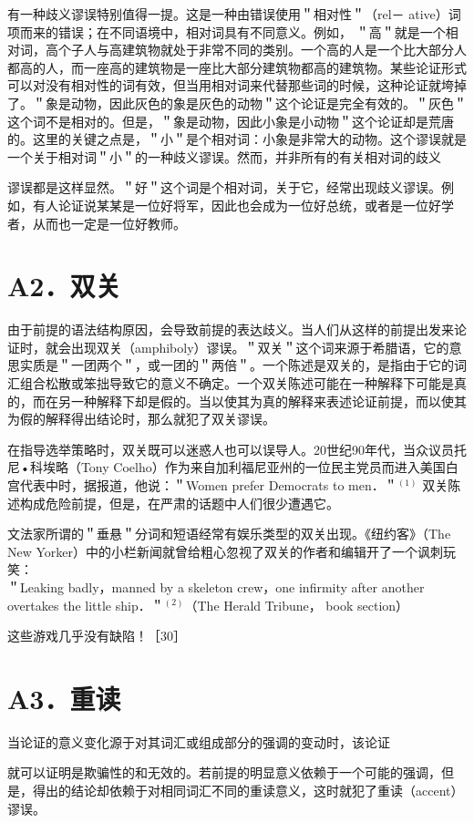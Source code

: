 有一种歧义谬误特别值得一提。这是一种由错误使用＂相对性＂（rel－ ative）词项而来的错误；在不同语境中，相对词具有不同意义。例如， ＂高＂就是一个相对词，高个子人与高建筑物就处于非常不同的类别。一个高的人是一个比大部分人都高的人，而一座高的建筑物是一座比大部分建筑物都高的建筑物。某些论证形式可以对没有相对性的词有效，但当用相对词来代替那些词的时候，这种论证就垮掉了。＂象是动物，因此灰色的象是灰色的动物＂这个论证是完全有效的。＂灰色＂这个词不是相对的。但是，＂象是动物，因此小象是小动物＂这个论证却是荒唐的。这里的关键之点是，＂小＂是个相对词：小象是非常大的动物。这个谬误就是一个关于相对词＂小＂的一种歧义谬误。然而，并非所有的有关相对词的歧义

谬误都是这样显然。＂好＂这个词是个相对词，关于它，经常出现歧义谬误。例如，有人论证说某某是一位好将军，因此也会成为一位好总统，或者是一位好学者，从而也一定是一位好教师。

\section*{A2．双关}
由于前提的语法结构原因，会导致前提的表达歧义。当人们从这样的前提出发来论证时，就会出现双关（amphiboly）谬误。＂双关＂这个词来源于希腊语，它的意思实质是＂一团两个＂，或一团的＂两倍＂。一个陈述是双关的，是指由于它的词汇组合松散或笨拙导致它的意义不确定。一个双关陈述可能在一种解释下可能是真的，而在另一种解释下却是假的。当以使其为真的解释来表述论证前提，而以使其为假的解释得出结论时，那么就犯了双关谬误。

在指导选举策略时，双关既可以迷惑人也可以误导人。20世纪90年代，当众议员托尼•科埃略（Tony Coelho）作为来自加利福尼亚州的一位民主党员而进入美国白宫代表中时，据报道，他说：＂Women prefer Democrats to men．＂${ }^{(1)}$ 双关陈述构成危险前提，但是，在严肃的话题中人们很少遭遇它。

文法家所谓的＂垂悬＂分词和短语经常有娱乐类型的双关出现。《纽约客》（The New Yorker）中的小栏新闻就曾给粗心忽视了双关的作者和编辑开了一个讽刺玩笑：\\
＂Leaking badly，manned by a skeleton crew，one infirmity after another overtakes the little ship．＂${ }^{(2)}$（The Herald Tribune， book section）

这些游戏几乎没有缺陷！［30］

\section*{A3．重读}
当论证的意义变化源于对其词汇或组成部分的强调的变动时，该论证

就可以证明是欺骗性的和无效的。若前提的明显意义依赖于一个可能的强调，但是，得出的结论却依赖于对相同词汇不同的重读意义，这时就犯了重读（accent）谬误。

